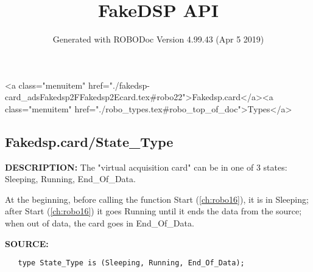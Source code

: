 \documentclass{article}
\title{FakeDSP API}
\author{Generated with ROBODoc Version 4.99.43 (Apr  5 2019)
}
\begin{document}
\maketitle
\printindex
\tableofcontents
\newpage

<a class="menuitem" href="./fakedsp-card_adsFakedsp2FFakedsp2Ecard.tex#robo22">Fakedsp.card</a><a class="menuitem" href="./robo_types.tex#robo_top_of_doc">Types</a>\subsection{Fakedsp.card/State\_Type}
\textbf{DESCRIPTION:}\hspace{0.08in}
   The "virtual acquisition card" can be in one of 3 states: Sleeping,
   Running, End\_Of\_Data.



   At the beginning, before calling the function Start (\ref{ch:robo16}), it
   is in Sleeping; after Start (\ref{ch:robo16}) it goes Running until it ends the
   data from the source; when out of data, the card goes in End\_Of\_Data.

\textbf{SOURCE:}\hspace{0.08in}\begin{verbatim}
   type State_Type is (Sleeping, Running, End_Of_Data);
\end{verbatim}
\end{document}
